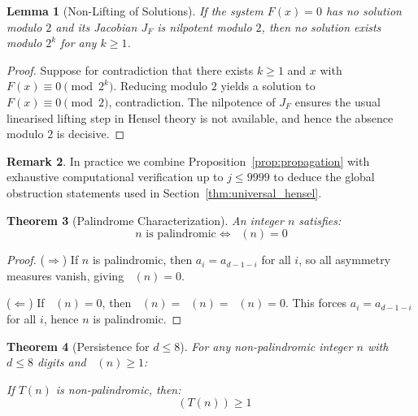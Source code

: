 \documentclass[11pt,a4paper]{article}
\theoremstyle{plain}
\newtheorem{theorem}{Theorem}[section]
\newtheorem{lemma}[theorem]{Lemma}
\theoremstyle{definition}
\newtheorem{remark}[theorem]{Remark}
\DeclareMathOperator{\Aext}{A^{\text{(ext)}}}
\DeclareMathOperator{\Aint}{A^{\text{(int)}}}
\DeclareMathOperator{\Acarry}{A^{\text{(carry)}}}
\DeclareMathOperator{\Arobust}{A^{\text{(robust)}}}
\begin{document}
\begin{lemma}[Non-Lifting of Solutions]\label{lem:non_lift}
If the system $F(x)=0$ has no solution modulo $2$ and its Jacobian $J_F$ is nilpotent modulo $2$, then no solution exists modulo $2^k$ for any $k\ge 1$.
\end{lemma}

\begin{proof}
Suppose for contradiction that there exists $k\ge1$ and $x$ with $F(x)\equiv0\pmod{2^k}$. Reducing modulo $2$ yields a solution to $F(x)\equiv0\pmod{2}$, contradiction. The nilpotence of $J_F$ ensures the usual linearised lifting step in Hensel theory is not available, and hence the absence modulo $2$ is decisive.
\end{proof}

\begin{remark}
In practice we combine Proposition~\ref{prop:propagation} with exhaustive computational verification up to $j\le 9999$ to deduce the global obstruction statements used in Section~\ref{thm:universal_hensel}.
\end{remark}

\begin{theorem}[Palindrome Characterization]\label{thm:palindrome_char}
An integer $n$ satisfies:
\begin{equation}
n \text{ is palindromic} \iff \Arobust(n) = 0
\end{equation}
\end{theorem}

\begin{proof}
($\Rightarrow$) If $n$ is palindromic, then $a_i = a_{d-1-i}$ for all $i$, so all asymmetry measures vanish, giving $\Arobust(n) = 0$.

\noindent
($\Leftarrow$) If $\Arobust(n) = 0$, then $\Aext(n) = \Aint(n) = \Acarry(n) = 0$. This forces $a_i = a_{d-1-i}$ for all $i$, hence $n$ is palindromic.
\end{proof}

\begin{theorem}[Persistence for $d \leq 8$]\label{thm:persistence}
For any non-palindromic integer $n$ with $d \leq 8$ digits and $\Arobust(n) \geq 1$:

If $T(n)$ is non-palindromic, then:
\begin{equation}
\Arobust(T(n)) \geq 1
\end{equation}
\end{theorem}
\end{document}
